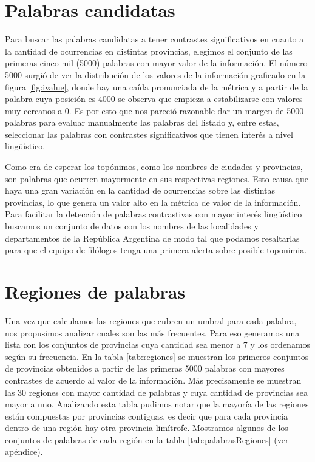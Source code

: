\section{Palabras candidatas} %
\label{palabras_candidatas}
Para buscar las palabras candidatas a tener contrastes significativos en cuanto a la cantidad de ocurrencias en distintas provincias, elegimos el conjunto de las primeras 
cinco mil (5000) palabras con mayor valor de la información. El número 5000 surgió de ver la distribución de los valores de la información graficado en la figura \ref{fig:ivalue}, donde hay una caída pronunciada de la métrica y a partir de la palabra cuya posición es 4000 se observa que empieza a estabilizarse con valores muy cercanos a 0. Es por esto que nos pareció razonable dar un margen de 5000 palabras para evaluar manualmente las palabras del listado y, entre estas, seleccionar las palabras con contrastes significativos que tienen interés a nivel lingüístico.

Como era de esperar los topónimos, como los nombres de ciudades y provincias, son palabras que ocurren mayormente en sus respectivas regiones. Esto causa que haya una gran variación en 
la cantidad de ocurrencias sobre las distintas provincias, lo que genera un valor alto en la métrica de valor de la información. Para facilitar la detección de palabras contrastivas con 
mayor interés lingüístico buscamos un conjunto de datos con los nombres de las localidades y departamentos de la República Argentina de modo tal que podamos resaltarlas para que el equipo de filólogos tenga una primera alerta sobre posible toponimia.



\section{Regiones de palabras} %
\label{sub:regiones_de_palabras}

Una vez que calculamos las regiones que cubren un umbral para cada palabra, nos propusimos analizar cuales son las más frecuentes. Para eso generamos una lista con los conjuntos de provincias cuya cantidad sea menor a 7 y los ordenamos según su frecuencia. En la tabla \ref{tab:regiones} se muestran los primeros conjuntos de provincias obtenidos a partir de las primeras 5000 palabras con mayores contrastes de acuerdo al valor de la información. Más precisamente se muestran las 30 regiones con mayor cantidad de palabras y cuya cantidad de provincias sea mayor a uno. Analizando esta tabla pudimos notar que la mayoría de las regiones están compuestas por provincias contiguas, es decir que para cada provincia dentro de una región hay otra provincia limítrofe. Mostramos algunos de los conjuntos de palabras de cada región en la tabla \ref{tab:palabrasRegiones} (ver apéndice). 

